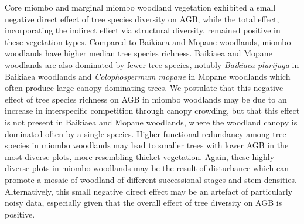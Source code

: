 \documentclass[11pt,a4paper]{article}
\begin{document}

Core miombo and marginal miombo woodland vegetation exhibited a small negative direct effect of tree species diversity on AGB, while the total effect, incorporating the indirect effect via  structural diversity, remained positive in these vegetation types. Compared to Baikiaea and Mopane woodlands, miombo woodlands have higher median tree species richness. Baikiaea and Mopane woodlands are also dominated by fewer tree species, notably \textit{Baikiaea plurijuga} in Baikiaea woodlands and \textit{Colophospermum mopane} in Mopane woodlands which often produce large canopy dominating trees. We postulate that this negative effect of tree species richness on AGB in miombo woodlands may be due to an increase in interspecific competition through canopy crowding, but that this effect is not present in Baikiaea and Mopane woodlands, where the woodland canopy is dominated often by a single species. Higher functional redundancy among tree species in miombo woodlands may lead to smaller trees with lower AGB in the most diverse plots, more resembling thicket vegetation. Again, these highly diverse plots in miombo woodlands may be the result of disturbance which can promote a mosaic of woodland of different successional stages and stem densities. Alternatively, this small negative direct effect may be an artefact of particularly noisy data, especially given that the overall effect of tree diversity on AGB is positive.
\end{document}
